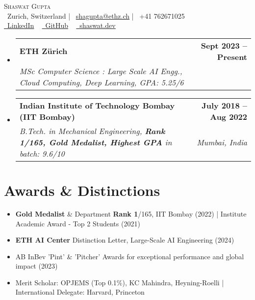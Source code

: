 \documentclass[letterpaper,10pt]{article}
\makeatletter
\newcommand{\resumeSubheading}[4]{
  \vspace{-2pt}\item
    \begin{tabular*}{1.0\textwidth}[t]{l@{\extracolsep{\fill}}r}
      \textbf{#1} & \textbf{\small #2} \\
      \textcolor{accentblue}{\textit{\small#3}} & \textit{\small #4} \\
    \end{tabular*}\vspace{-7pt}
}
\newcommand{\resumeSubHeadingListStart}{\begin{itemize}[leftmargin=0.0in, label={}]}
\newcommand{\resumeSubHeadingListEnd}{\end{itemize}}
\makeatother
\begin{document}
\begin{center}
{\Huge \textcolor{accentblue}{\scshape Shaswat Gupta}} \\ \vspace{2pt}
\faMapMarker~Zurich, Switzerland \quad | \quad \faEnvelope~\href{mailto:shagupta@ethz.ch}{shagupta@ethz.ch} \quad | \quad \faPhone~+41 762671025 \\ \vspace{1pt}
\small
\href{https://linkedin.com/in/shaswat-gupta/}{\raisebox{-0.2\height}\faLinkedin\ \textcolor{accentblue}{\underline{LinkedIn}}}  ~
\href{https://github.com/Shaswat-G}{\raisebox{-0.2\height}\faGithub\ \textcolor{accentblue}{\underline{GitHub}}} ~
\href{https://shaswat.dev}{\raisebox{-0.2\height}\faGlobe\ \textcolor{accentblue}{\underline{shaswat.dev}}}
\vspace{-8pt}
\end{center}

\resumeSubHeadingListStart
    \resumeSubheading
      {ETH Zürich}{Sept 2023 -- Present}
      {MSc Computer Science : Large Scale AI Engg., Cloud Computing, Deep Learning, GPA: 5.25/6}{}
    \resumeSubheading
      {Indian Institute of Technology Bombay (IIT Bombay)}{July 2018 -- Aug 2022}
          {B.Tech. in Mechanical Engineering, \textbf{Rank 1/165, Gold Medalist, Highest GPA} in batch: 9.6/10}{Mumbai, India}
\resumeSubHeadingListEnd

\section{Awards \& Distinctions}
\vspace{-4pt}
{\small
\begin{itemize}[leftmargin=0.15in, itemsep=-2pt]
  \item \textbf{Gold Medalist} \& Department \textbf{Rank 1}/165, IIT Bombay (2022) | Institute Academic Award - Top 2 Students (2021)
  \item \textbf{ETH AI Center} Distinction Letter, Large-Scale AI Engineering (2024)
  \item AB InBev 'Pint' \& 'Pitcher' Awards for exceptional performance and global impact (2023)
  \item Merit Scholar: OPJEMS (Top 0.1\%), KC Mahindra, Heyning-Roelli | International Delegate: Harvard, Princeton
\end{itemize}
}
\vspace{-10pt}
\end{document}
